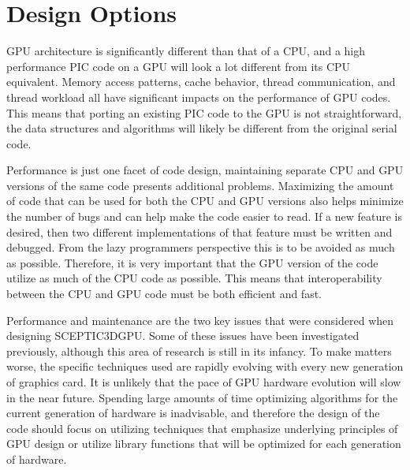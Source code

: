 \chapter{Design Options}
\label{ch:design}

GPU architecture is significantly different than that of a CPU, and a high performance PIC code on a GPU will look a lot different from its CPU equivalent. Memory access patterns, cache behavior, thread communication, and thread workload all have significant impacts on the performance of GPU codes. This means that porting an existing PIC code to the GPU is not straightforward, the data structures and algorithms will likely be different from the original serial code. 

Performance is just one facet of code design, maintaining separate CPU and GPU versions of the same code presents additional problems. Maximizing the amount of code that can be used for both the CPU and GPU versions also helps minimize the number of bugs and can help make the code easier to read. If a new feature is desired, then two different implementations of that feature must be written and debugged. From the lazy programmers perspective this is to be avoided as much as possible. Therefore, it is very important that the GPU version of the code utilize as much of the CPU code as possible. This means that interoperability between the CPU and GPU code must be both efficient and fast. 

Performance and maintenance are the two key issues that were considered when designing SCEPTIC3DGPU. Some of these issues have been investigated previously, although this area of research is still in its infancy. To make matters worse, the specific techniques used are rapidly evolving with every new generation of graphics card. It is unlikely that the pace of GPU hardware evolution will slow in the near future. Spending large amounts of time optimizing algorithms for the current generation of hardware is inadvisable, and therefore the design of the code should focus on utilizing techniques that emphasize underlying principles of GPU design or utilize library functions that will be optimized for each generation of hardware. 

